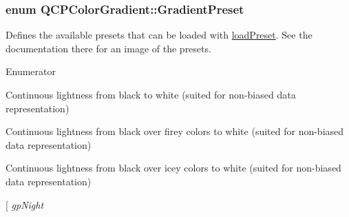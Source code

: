 \subsubsection[{Gradient\+Preset}]{\setlength{\rightskip}{0pt plus 5cm}enum {\bf Q\+C\+P\+Color\+Gradient\+::\+Gradient\+Preset}}\label{class_q_c_p_color_gradient_aed6569828fee337023670272910c9072}
Defines the available presets that can be loaded with \hyperlink{class_q_c_p_color_gradient_aa0aeec1528241728b9671bf8e60b1622}{load\+Preset}. See the documentation there for an image of the presets. \begin{Desc}
\item[Enumerator]\par
\begin{description}
\item[{\em 
\hypertarget{class_q_c_p_color_gradient_aed6569828fee337023670272910c9072add11ae369a86f3b1b6205ec72e5021fb}{}gp\+Grayscale\label{class_q_c_p_color_gradient_aed6569828fee337023670272910c9072add11ae369a86f3b1b6205ec72e5021fb}
}]Continuous lightness from black to white (suited for non-\/biased data representation) \item[{\em 
\hypertarget{class_q_c_p_color_gradient_aed6569828fee337023670272910c9072a4f42e534cf6cff5a29a5388094d099b5}{}gp\+Hot\label{class_q_c_p_color_gradient_aed6569828fee337023670272910c9072a4f42e534cf6cff5a29a5388094d099b5}
}]Continuous lightness from black over firey colors to white (suited for non-\/biased data representation) \item[{\em 
\hypertarget{class_q_c_p_color_gradient_aed6569828fee337023670272910c9072aec8c001f62c0d5cb853db5fd85309557}{}gp\+Cold\label{class_q_c_p_color_gradient_aed6569828fee337023670272910c9072aec8c001f62c0d5cb853db5fd85309557}
}]Continuous lightness from black over icey colors to white (suited for non-\/biased data representation) \item[{\em 
\hypertarget{class_q_c_p_color_gradient_aed6569828fee337023670272910c9072a1bb89351b6def7d220973443fe059c62}{}gp\+Night\label{class_q_c_p_color_gradient_aed6569828fee337023670272910c9072a1bb89351b6def7d220973443fe059c62}
}
\end{description}
\end{Desc}
